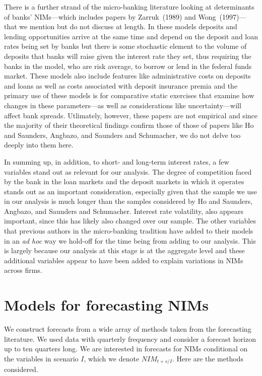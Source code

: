 \documentclass[11pt]{article}
\begin{document}
There is a further strand of the micro-banking literature looking at determinants of banks' NIMs---which includes papers by Zarruk~(1989) and Wong~(1997)---that we mention but do not discuss at length.  In these models deposits and lending opportunities arrive at the same time and depend on the deposit and loan rates being set by banks but there is some stochastic element to the volume of deposits that banks will raise given the interest rate they set, thus requiring the banks in the model, who are risk average, to borrow or lend in the federal funds market.  These models also include features like administrative costs on deposits and loans as well as costs associated with deposit insurance premia and the primary use of these models is for comparative static exercises that examine how changes in these parameters---as well as considerations like uncertainty---will affect bank spreads.  Utlimately, however, these papers are not empirical and since the majority of their theoretical findings confirm those of those of papers like Ho and Saunders, Angbazo, and Saunders and Schumacher, we do not delve too deeply into them here.

In summing up, in addition, to short- and long-term interest rates, a few variables stand out as relevant for our analysis.  The degree of competition faced by the bank in the loan markets and the deposit markets in which it operates stands out as an important consideration, especially given that the sample we use in our analysis is much longer than the samples considered by Ho and Saunders, Angbazo, and Saunders and Schumacher.  Interest rate volatility, also appears important, since this has likely also changed over our sample.  The other variables that previous authors in the micro-banking tradition have added to their models in an \textit{ad hoc} way we hold-off for the time being from adding to our analysis.  This is largely because our analysis at this stage is at the aggregate level and these additional variables appear to have been added to explain variations in NIMs across firms.

\section{Models for forecasting NIMs}

We construct forecasts from a wide array of methods taken from the forecasting literature. We used data with quarterly frequency and consider a forecast horizon up to ten quarters long. We are interested in forecasts for NIMs conditional on the variables in scenario $I$, which we denote $NIM_{t+s/I}$. Here are the methods considered.
\end{document}

